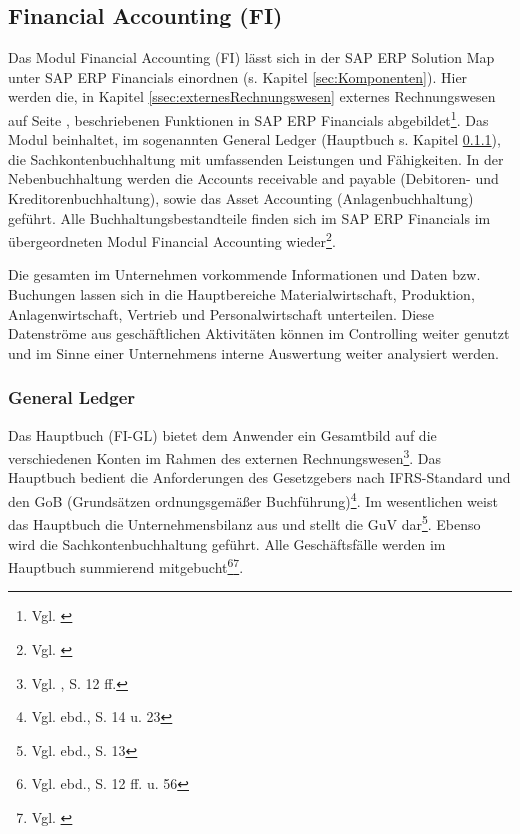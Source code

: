 \subsection{Financial Accounting (FI)} %
Das Modul Financial Accounting (FI) lässt sich in der SAP ERP Solution Map unter SAP ERP Financials einordnen (s. Kapitel \ref{sec:Komponenten}). 
Hier werden die, in Kapitel \ref{ssec:externesRechnungswesen} externes Rechnungswesen auf Seite \pageref{ssec:externesRechnungswesen}, beschriebenen Funktionen in SAP ERP Financials abgebildet\footnote{Vgl. \cite{SAPBusinessMaps2010}}. Das Modul beinhaltet, im sogenannten General Ledger (Hauptbuch s. Kapitel \ref{sec:gl}), die Sachkontenbuchhaltung mit umfassenden Leistungen und Fähigkeiten. In der Nebenbuchhaltung werden die Accounts receivable and payable (Debitoren- und Kreditorenbuchhaltung), sowie das Asset Accounting (Anlagenbuchhaltung) geführt. 
Alle Buchhaltungsbestandteile finden sich im SAP ERP Financials im übergeordneten Modul Financial Accounting wieder\footnote{Vgl. \cite{SAPBusinessMaps2010}}. 

Die gesamten im Unternehmen vorkommende Informationen und Daten bzw. Buchungen lassen sich in die Hauptbereiche Materialwirtschaft, Produktion, Anlagenwirtschaft, Vertrieb und Personalwirtschaft unterteilen. Diese Datenströme aus geschäftlichen Aktivitäten können im Controlling weiter genutzt und im Sinne einer Unternehmens interne Auswertung weiter analysiert werden.

\subsubsection{General Ledger} \label{sec:gl}%
Das Hauptbuch (FI-GL) bietet dem Anwender ein Gesamtbild auf die verschiedenen Konten im Rahmen des externen Rechnungswesen\footnote{Vgl. \cite{SAPGL2001}, S. 12 ff.}. Das Hauptbuch bedient die Anforderungen des Gesetzgebers nach IFRS-Standard und den GoB (Grundsätzen ordnungsgemäßer Buchführung)\footnote{Vgl. ebd., S. 14 u. 23}. Im wesentlichen weist das Hauptbuch die Unternehmensbilanz aus und stellt die GuV dar\footnote{Vgl. ebd., S. 13}. Ebenso wird die Sachkontenbuchhaltung geführt. Alle Geschäftsfälle werden im Hauptbuch summierend mitgebucht\footnote{Vgl. ebd., S. 12 ff. u. 56}\footnote{Vgl. \cite{FICOForum2012}}. 

